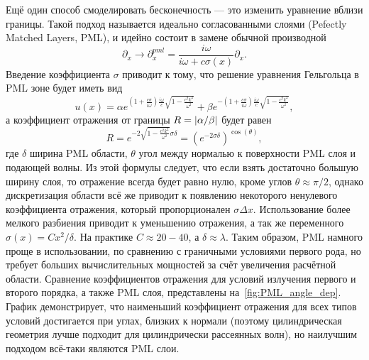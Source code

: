 Ещё один способ смоделировать бесконечность --- это изменить уравнение вблизи границы. Такой подход называется идеально согласованными слоями (Pefectly Matched Layers, PML), и идейно состоит в замене обычной производной~\cite{nataf2013absorbing}
\begin{equation}
    \partial_x \to \partial^{pml}_x =\frac{i \omega}{i \omega + c \sigma(x) }\partial_x.
\end{equation}
Введение коэффициента $\sigma$ приводит к тому, что решение уравнения Гельгольца в PML зоне будет иметь вид
\begin{equation}
    u(x) =\alpha e^{(1+\frac{c \sigma}{i \omega})\frac{i \omega}{c}\sqrt{1-\frac{c^2 k^2}{\omega^2}}}+ \beta e^{-(1+\frac{c \sigma}{i \omega})\frac{i \omega}{c}\sqrt{1-\frac{c^2 k^2}{\omega^2}}},
\end{equation}
а коэффициент отражения от границы $R = \lvert\alpha/\beta\rvert$ будет равен
\begin{equation}
    R = e^{-2\sqrt{1-\frac{c^2 k^2}{\omega^2}}\sigma \delta} = (e^{-2\sigma \delta})^{\cos(\theta)},
\end{equation}
где $\delta$ ширина PML области, $\theta$ угол между нормалью к поверхности PML слоя и подающей волны. Из этой формулы следует, что если взять достаточно большую ширину слоя, то отражение всегда будет равно нулю, кроме углов $\theta \approx \pi/2$, однако дискретизация области всё же приводит к появлению некоторого ненулевого коэффициента отражения, который пропорционален $\sigma \Delta x$. Использование более мелкого разбиения приводит к уменьшению отражения, а так же переменного $\sigma(x) = C x^2/\delta$. На практике $C \approx 20-40$, а $\delta \approx \lambda$. Таким образом, PML намного проще в использовании, по сравнению с граничными условиями первого рода, но требует больших вычислительных мощностей за счёт увеличения расчётной области. Сравнение коэффициентов отражения для условий излучения первого и второго порядка, а также PML слоя, представлены на~\ref{fig:PML_angle_dep}. График демонстрирует, что наименьший коэффициент отражения для всех типов условий достигается при углах, близких к нормали (поэтому цилиндрическая геометрия лучше подходит для цилиндрически рассеянных волн), но  наилучшим подходом всё-таки являются PML слои.
